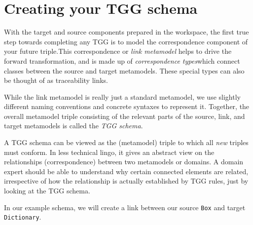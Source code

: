 \newpage
\hypertarget{TGGSchema}{}
\section{Creating your TGG schema}
\genHeader

With the target and source components prepared in the workspace, the first true step towards completing any TGG is to model the correspondence component of your
future triple.This correspondence or \emph{link metamodel} helps to drive the forward transformation, and is made up of
\emph{correspondence types}which connect classes between the source and target metamodels. These special types can also be thought
of as traceability links.

While the link metamodel is really just a standard metamodel, we use slightly different naming conventions and concrete syntaxes to represent it. Together, the overall metamodel triple consisting of the relevant parts of the source, link, and target metamodels is called the \emph{TGG
schema}.

A TGG schema can be viewed as the (metamodel) triple to which all \emph{new} triples must conform. In less technical lingo, it gives an abstract view on the
relationships (correspondence) between two metamodels or domains. A domain expert should be able to understand why certain connected elements are related,
irrespective of how the relationship is actually established by TGG rules, just by looking at the TGG schema. 


In our example schema, we will create a link between our source \texttt{Box} and target \texttt{Dictionary}.






